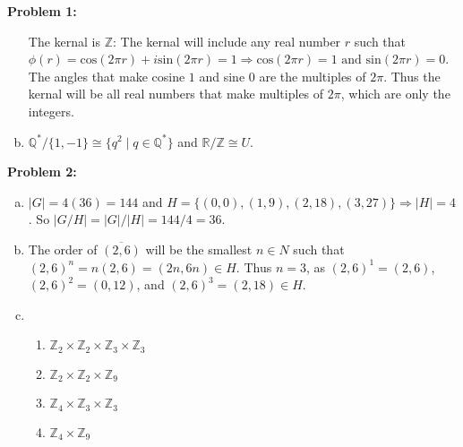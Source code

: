 \documentclass[12pt, letterpaper]{article}
\newenvironment{problem}
    [1]
    {\noindent \textbf{Problem #1:}}
    {\vspace{3mm}}
\begin{document}
\begin{problem}{1}
\begin{enumerate}[(a)]
        \bigskip\noindent
        The kernal is $\mathbb{Z}$: The kernal will include any real number $r$ such that
        $\phi(r) = \text{cos}(2\pi r) + i\text{sin}(2\pi r) = 1 \Rightarrow \text{cos}(2\pi r)
        = 1 \text{ and } \text{sin}(2\pi r) = 0$. The angles that make cosine $1$ and sine $0$
        are the multiples of $2\pi$. Thus the kernal will be all real numbers that make multiples
        of $2\pi$, which are only the integers.

        \item $\mathbb{Q}^* / \{1, -1\} \cong \{q^2 \;|\; q \in \mathbb{Q}^*\}$ and $\mathbb{R}
        / \mathbb{Z} \cong U$.

    \end{enumerate}
\end{problem}

\begin{problem}{2}
    \begin{enumerate}[(a)]
        \item $|G| = 4(36) = 144$ and $H = \{(0, 0), (1, 9), (2, 18), (3, 27)\} \Rightarrow |H| = 4$.
        So $|G/H| = |G|/|H| = 144 / 4 = 36$.

        \item The order of $\overline{(2,6)}$ will be the smallest $n \in N$ such that $(2,6)^n =
        n(2, 6) = (2n, 6n) \in H$. Thus $n = 3$, as $(2,6)^1 = (2, 6)$, $(2,6)^2 = (0, 12)$, 
        and $(2, 6)^3 = (2, 18) \in H$.

        \item 
        \begin{enumerate}[1.]
            \item $\mathbb{Z}_2 \times \mathbb{Z}_2 \times \mathbb{Z}_3 \times \mathbb{Z}_3$
            \item $\mathbb{Z}_2 \times \mathbb{Z}_2 \times \mathbb{Z}_9$
            \item $\mathbb{Z}_4 \times \mathbb{Z}_3 \times \mathbb{Z}_3$
            \item $\mathbb{Z}_4 \times \mathbb{Z}_9$
        \end{enumerate}


\end{enumerate}
\end{problem}
\end{document}
